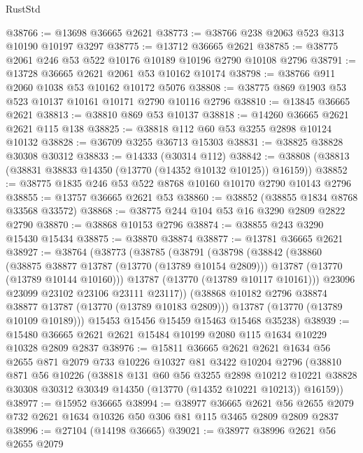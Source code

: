 \begin{lexlean}{RustStd}
\begin{coremodule}
@38766 := @13698 @36665 @2621
@38773 := @38766 @238 @2063 @523 @313 @10190 @10197 @3297
@38775 := @13712 @36665 @2621
@38785 := @38775 @2061 @246 @53 @522 @10176 @10189 @10196 @2790 @10108 @2796
@38791 := @13728 @36665 @2621 @2061 @53 @10162 @10174
@38798 := @38766 @911 @2060 @1038 @53 @10162 @10172 @5076
@38808 := @38775 @869 @1903 @53 @523 @10137 @10161 @10171 @2790 @10116 @2796
@38810 := @13845 @36665 @2621
@38813 := @38810 @869 @53 @10137
@38818 := @14260 @36665 @2621 @2621 @115 @138
@38825 := @38818 @112 @60 @53 @3255 @2898 @10124 @10132
@38828 := @36709 @3255 @36713 @15303
@38831 := @38825 @38828 @30308 @30312
@38833 := @14333 (@30314 @112)
@38842 := @38808 (@38813 (@38831 @38833 @14350 (@13770 (@14352 @10132 @10125)) @16159))
@38852 := @38775 @1835 @246 @53 @522 @8768 @10160 @10170 @2790 @10143 @2796
@38855 := @13757 @36665 @2621 @53
@38860 := @38852 (@38855 @1834 @8768 @33568 @33572)
@38868 := @38775 @244 @104 @53 @16 @3290 @2809 @2822 @2790
@38870 := @38868 @10153 @2796
@38874 := @38855 @243 @3290 @15430 @15434
@38875 := @38870 @38874
@38877 := @13781 @36665 @2621
@38927 := @38764
    (@38773
      (@38785
        (@38791
          (@38798
            (@38842
              (@38860
                (@38875 @38877 @13787 (@13770 (@13789 @10154 @2809)))
                @13787
                (@13770 (@13789 @10144 @10160)))
              @13787
              (@13770 (@13789 @10117 @10161)))
            @23096
            @23099
            @23102
            @23106
            @23111
            @23117))
        (@38868 @10182 @2796 @38874 @38877 @13787 (@13770 (@13789 @10183 @2809)))
        @13787
        (@13770 (@13789 @10109 @10189)))
      @15453
      @15456
      @15459
      @15463
      @15468
      @35238)
@38939 := @15480 @36665 @2621 @2621 @15484 @10199 @2080 @115 @1634 @10229 @10328 @2809 @2837
@38976 := @15811
    @36665
    @2621
    @2621
    @1634
    @56
    @2655
    @871
    @2079
    @733
    @10226
    @10327
    @81
    @3422
    @10204
    @2796
    (@38810
      @871
      @56
      @10226
      (@38818
        @131
        @60
        @56
        @3255
        @2898
        @10212
        @10221
        @38828
        @30308
        @30312
        @30349
        @14350
        (@13770 (@14352 @10221 @10213))
        @16159))
@38977 := @15952 @36665
@38994 := @38977
    @36665
    @2621
    @56
    @2655
    @2079
    @732
    @2621
    @1634
    @10326
    @50
    @306
    @81
    @115
    @3465
    @2809
    @2809
    @2837
@38996 := @27104 (@14198 @36665)
@39021 := @38977
    @38996
    @2621
    @56
    @2655
    @2079

\end{coremodule}
\end{lexlean}
